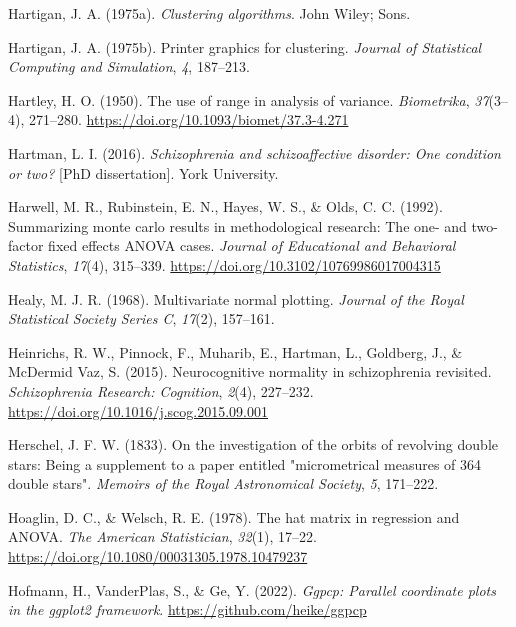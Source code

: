 \documentclass[
  letterpaper,
  10pt,
  krantz2]{krantz}
\newlength{\cslhangindent}
\newenvironment{CSLReferences}[2] %
 {\begin{list}{}{%
  \setlength{\itemindent}{0pt}
  \setlength{\leftmargin}{0pt}
  \setlength{\parsep}{0pt}
  \ifodd #1
   \setlength{\leftmargin}{\cslhangindent}
   \setlength{\itemindent}{-1\cslhangindent}
  \fi
  \setlength{\itemsep}{#2\baselineskip}}}
 {\end{list}}
\begin{document}
\begin{CSLReferences}{1}{0}
Hartigan, J. A. (1975a). \emph{Clustering algorithms}. John Wiley; Sons.

Hartigan, J. A. (1975b). Printer graphics for clustering. \emph{Journal
of Statistical Computing and Simulation}, \emph{4}, 187--213.

Hartley, H. O. (1950). The use of range in analysis of variance.
\emph{Biometrika}, \emph{37}(3--4), 271--280.
\url{https://doi.org/10.1093/biomet/37.3-4.271}

Hartman, L. I. (2016). \emph{Schizophrenia and schizoaffective disorder:
One condition or two?} {[}PhD dissertation{]}. York University.

Harwell, M. R., Rubinstein, E. N., Hayes, W. S., \& Olds, C. C. (1992).
Summarizing monte carlo results in methodological research: The one- and
two-factor fixed effects {ANOVA} cases. \emph{Journal of Educational and
Behavioral Statistics}, \emph{17}(4), 315--339.
\url{https://doi.org/10.3102/10769986017004315}

Healy, M. J. R. (1968). Multivariate normal plotting. \emph{Journal of
the Royal Statistical Society Series C}, \emph{17}(2), 157--161.

Heinrichs, R. W., Pinnock, F., Muharib, E., Hartman, L., Goldberg, J.,
\& McDermid Vaz, S. (2015). Neurocognitive normality in schizophrenia
revisited. \emph{Schizophrenia Research: Cognition}, \emph{2}(4),
227--232. \url{https://doi.org/10.1016/j.scog.2015.09.001}

Herschel, J. F. W. (1833). On the investigation of the orbits of
revolving double stars: Being a supplement to a paper entitled
"micrometrical measures of 364 double stars". \emph{Memoirs of the Royal
Astronomical Society}, \emph{5}, 171--222.

Hoaglin, D. C., \& Welsch, R. E. (1978). The hat matrix in regression
and {ANOVA}. \emph{The American Statistician}, \emph{32}(1), 17--22.
\url{https://doi.org/10.1080/00031305.1978.10479237}

Hofmann, H., VanderPlas, S., \& Ge, Y. (2022). \emph{Ggpcp: Parallel
coordinate plots in the ggplot2 framework}.
\url{https://github.com/heike/ggpcp}


\end{CSLReferences}
\end{document}
